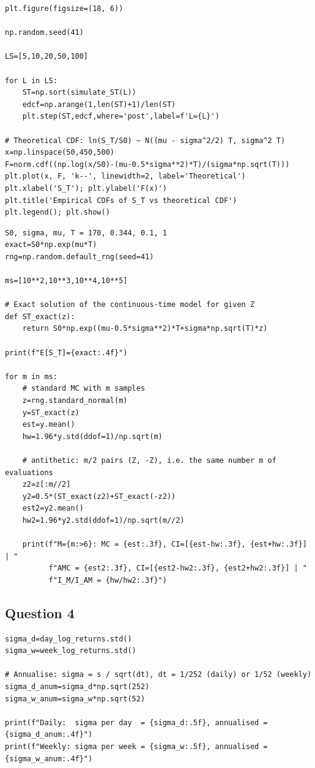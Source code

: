 \documentclass[11pt,a4paper]{article}
\begin{document}
\begin{lstlisting}[caption={Q3a: empirical CDFs of $S_T$ for $L=5,\dots,100$ vs.\ the theoretical log-normal CDF.}, label={lst:q3a-ecdf}]
plt.figure(figsize=(18, 6))

np.random.seed(41)

LS=[5,10,20,50,100]

for L in LS:
    ST=np.sort(simulate_ST(L))
    edcf=np.arange(1,len(ST)+1)/len(ST)
    plt.step(ST,edcf,where='post',label=f'L={L}')

# Theoretical CDF: ln(S_T/S0) ~ N((mu - sigma^2/2) T, sigma^2 T)
x=np.linspace(50,450,500)
F=norm.cdf((np.log(x/S0)-(mu-0.5*sigma**2)*T)/(sigma*np.sqrt(T)))
plt.plot(x, F, 'k--', linewidth=2, label='Theoretical')
plt.xlabel('S_T'); plt.ylabel('F(x)')
plt.title('Empirical CDFs of S_T vs theoretical CDF')
plt.legend(); plt.show()
\end{lstlisting}

\begin{lstlisting}[caption={Q3b: standard MC vs.\ antithetic variables for $\mathbb E[S_T]$.}, label={lst:q3b}]
S0, sigma, mu, T = 170, 0.344, 0.1, 1
exact=S0*np.exp(mu*T)
rng=np.random.default_rng(seed=41)

ms=[10**2,10**3,10**4,10**5]

# Exact solution of the continuous-time model for given Z
def ST_exact(z):
    return S0*np.exp((mu-0.5*sigma**2)*T+sigma*np.sqrt(T)*z)

print(f"E[S_T]={exact:.4f}")

for m in ms:
    # standard MC with m samples
    z=rng.standard_normal(m)
    y=ST_exact(z)
    est=y.mean()
    hw=1.96*y.std(ddof=1)/np.sqrt(m)

    # antithetic: m/2 pairs (Z, -Z), i.e. the same number m of evaluations
    z2=z[:m//2]
    y2=0.5*(ST_exact(z2)+ST_exact(-z2))
    est2=y2.mean()
    hw2=1.96*y2.std(ddof=1)/np.sqrt(m//2)

    print(f"M={m:>6}: MC = {est:.3f}, CI=[{est-hw:.3f}, {est+hw:.3f}] | "
          f"AMC = {est2:.3f}, CI=[{est2-hw2:.3f}, {est2+hw2:.3f}] | "
          f"I_M/I_AM = {hw/hw2:.3f}")
\end{lstlisting}

\subsection{Question 4}

\begin{lstlisting}[caption={Q4a: historical volatility from daily and weekly data.}, label={lst:q4a}]
sigma_d=day_log_returns.std()
sigma_w=week_log_returns.std()

# Annualise: sigma = s / sqrt(dt), dt = 1/252 (daily) or 1/52 (weekly)
sigma_d_anum=sigma_d*np.sqrt(252)
sigma_w_anum=sigma_w*np.sqrt(52)

print(f"Daily:  sigma per day  = {sigma_d:.5f}, annualised = {sigma_d_anum:.4f}")
print(f"Weekly: sigma per week = {sigma_w:.5f}, annualised = {sigma_w_anum:.4f}")
\end{lstlisting}
\end{document}
